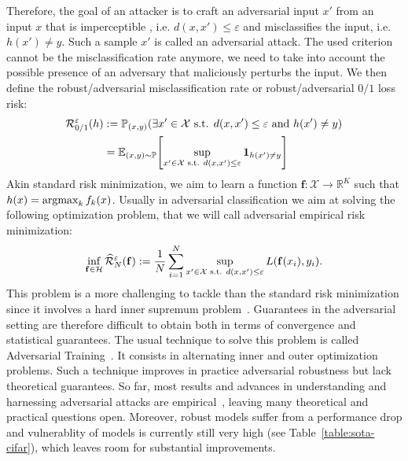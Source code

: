 Therefore, the goal of an attacker is to craft an adversarial input $x'$ from an input $x$ that is imperceptible , i.e. $d(x,x')\leq \varepsilon$ and misclassifies the input, i.e. $h(x')\neq y$. Such a sample $x'$ is called an adversarial attack. The used criterion cannot be the misclassification rate anymore, we need to take into account the possible presence of an adversary that maliciously perturbs the input. We then define the robust/adversarial misclassification rate or robust/adversarial $0/1$ loss risk: 
\begin{align*}
\risk_{0/1}^{\varepsilon}(h)&:=\PP_{(x,y)}(\exists x'\in\XX\text{ s.t. } d(x,x')\leq \varepsilon \text{ and } h(x')\neq y)\\
&= \EE_{(x,y)\sim\PP}\left[\sup_{x'\in\XX\text{ s.t. } d(x,x')\leq \varepsilon}\mathbf{1}_{h(x')\neq y}\right]
\end{align*}
Akin standard risk minimization, we aim to learn a function $\mathbf{f}:\mathcal{X}\to\mathbb{R}^K$ such that $h(x)=\operatorname*{argmax}_k f_k(x)$. Usually in adversarial classification we aim at solving the following optimization problem, that we will call adversarial empirical risk minimization:
\begin{align*}
\inf_{\mathbf{f}\in\mathcal{H}}\widehat{\mathcal{R}}^\varepsilon_{N}(\mathbf{f}):= \frac{1}{N}\sum_{i=1}^N\sup_{x'\in\mathcal{X}\text{ s.t. } d(x,x')\leq \varepsilon} L(\mathbf{f}(x_i),y_i).
\end{align*}
This problem is a  more challenging to tackle than the standard risk minimization  since it involves a hard inner supremum problem~\citep{madry2017towards}. Guarantees in the adversarial setting are therefore difficult to obtain both in terms of convergence and statistical guarantees. The usual technique to solve this problem is called Adversarial Training~\citep{goodfellow2014explaining,madry2017towards}. It consists in alternating inner and outer optimization problems. Such a technique improves in practice adversarial robustness but lack theoretical guarantees. So far, most results and advances in understanding and harnessing adversarial attacks are empirical~\citep{ilyas2019adversarial,rice2020overfitting}, leaving many theoretical and practical questions open.  Moreover, robust models suffer from a performance drop and vulnerablity of models is currently still very high (see Table~\ref{table:sota-cifar}), which leaves room for substantial improvements.

